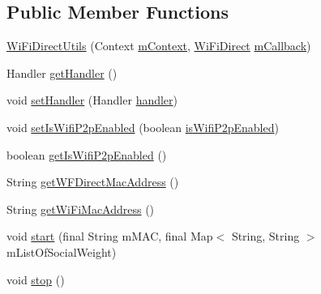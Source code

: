 \subsection*{Public Member Functions}
\begin{DoxyCompactItemize}
\item 
\hyperlink{classcom_1_1copelabs_1_1oiframework_1_1wifi_1_1_wi_fi_direct_utils_aa781d8a3adc56542ef3a8ef675731158}{Wi\+Fi\+Direct\+Utils} (Context \hyperlink{classcom_1_1copelabs_1_1oiframework_1_1wifi_1_1_wi_fi_direct_utils_a7eb74c5567159ba6d78c824d290c07bb}{m\+Context}, \hyperlink{classcom_1_1copelabs_1_1oiframework_1_1wifi_1_1_wi_fi_direct}{Wi\+Fi\+Direct} \hyperlink{classcom_1_1copelabs_1_1oiframework_1_1wifi_1_1_wi_fi_direct_utils_af418801f7c19d45da15758d1bc249bff}{m\+Callback})
\item 
Handler \hyperlink{classcom_1_1copelabs_1_1oiframework_1_1wifi_1_1_wi_fi_direct_utils_a9b56b3303022e512107625b844f1d7d1}{get\+Handler} ()
\item 
void \hyperlink{classcom_1_1copelabs_1_1oiframework_1_1wifi_1_1_wi_fi_direct_utils_a17b28a093d6c475b0c18cae14bdb821c}{set\+Handler} (Handler \hyperlink{classcom_1_1copelabs_1_1oiframework_1_1wifi_1_1_wi_fi_direct_utils_af585a8ac857febc2ac01888cb7281db2}{handler})
\item 
void \hyperlink{classcom_1_1copelabs_1_1oiframework_1_1wifi_1_1_wi_fi_direct_utils_a4eead54248c89920a0be71cb7bf8b807}{set\+Is\+Wifi\+P2p\+Enabled} (boolean \hyperlink{classcom_1_1copelabs_1_1oiframework_1_1wifi_1_1_wi_fi_direct_utils_a77f5909127d477f0630858fe4f68df46}{is\+Wifi\+P2p\+Enabled})
\item 
boolean \hyperlink{classcom_1_1copelabs_1_1oiframework_1_1wifi_1_1_wi_fi_direct_utils_a8b76b8a077829299388b493d9e7e9cbb}{get\+Is\+Wifi\+P2p\+Enabled} ()
\item 
String \hyperlink{classcom_1_1copelabs_1_1oiframework_1_1wifi_1_1_wi_fi_direct_utils_ab4db03fbc9387b2f49002224171ca743}{get\+W\+F\+Direct\+Mac\+Address} ()
\item 
String \hyperlink{classcom_1_1copelabs_1_1oiframework_1_1wifi_1_1_wi_fi_direct_utils_ac93d53d24424cd39ea70b371b58b89b2}{get\+Wi\+Fi\+Mac\+Address} ()
\item 
void \hyperlink{classcom_1_1copelabs_1_1oiframework_1_1wifi_1_1_wi_fi_direct_utils_aaa6cf1b0d0105e6211e5bf7d9ec929b1}{start} (final String m\+M\+A\+C, final Map$<$ String, String $>$ m\+List\+Of\+Social\+Weight)
\item 
void \hyperlink{classcom_1_1copelabs_1_1oiframework_1_1wifi_1_1_wi_fi_direct_utils_a0903f28238740adb65d2cbbd5d9cc27b}{stop} ()

\end{DoxyCompactItemize}
